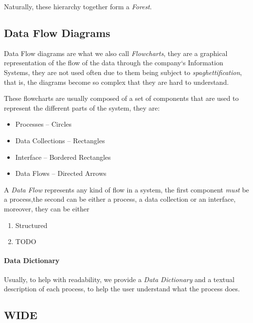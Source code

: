 \documentclass[openright, twoside, twocolumn]{report}
\begin{document}
    Naturally, these hierarchy together form a \emph{Forest}.

    \subsection{Data Flow Diagrams}

    Data Flow diagrams are what we also call \emph{Flowcharts}, they are a graphical
    representation of the flow of the data through the company`s Information Systems,
    they are not used often due to them being subject to \emph{spaghettification},
    that is, the diagrams become so complex that they are hard to understand.

    These flowcharts are usually composed of a set of components that are used to represent
    the different parts of the system, they are:
    \begin{itemize}
      \item Processes -- Circles
      \item Data Collections -- Rectangles
      \item Interface -- Bordered Rectangles
      \item Data Flows -- Directed Arrows
    \end{itemize}

    \begin{definition}
      A \emph{Data Flow} represents any kind of flow in a system, the first component \emph{must}
      be a process,the second can be either a process, a data collection or an interface, moreover,
      they can be either
      \begin{enumerate}
        \item Structured
        \item TODO
      \end{enumerate}
    \end{definition}

    \paragraph{Data Dictionary}

    Usually, to help with readability, we provide a \emph{Data Dictionary} and a textual description of each process,
    to help the user understand what the process does.

    \subsection{WIDE}
\end{document}

